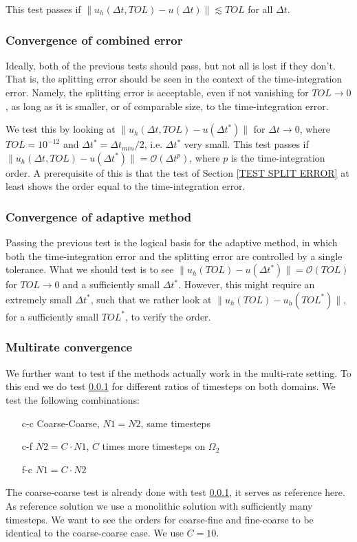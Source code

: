 \documentclass[a4paper,10pt]{article}
\begin{document}
This test passes if $\| u_h(\Delta t, TOL) - u(\Delta t)\| \lesssim TOL$ for all $\Delta t$.
%
\subsubsection{Convergence of combined error}\label{TEST COMB ERROR}
% 
Ideally, both of the previous tests should pass, but not all is lost if they don't. That is, the splitting error should be seen in the context of the time-integration error. Namely, the splitting error is acceptable, even if not vanishing for $TOL \rightarrow 0$, as long as it is smaller, or of comparable size, to the time-integration error.

We test this by looking at $\|u_h(\Delta t, TOL) - u(\Delta t^*) \|$ for $\Delta t \rightarrow 0$, where $TOL = 10^{-12}$ and $\Delta t^* = \Delta t_{min}/2$, i.e. $\Delta t^*$ very small. This test passes if $\|u_h(\Delta t, TOL) - u(\Delta t^*) \| = \mathcal{O}(\Delta t^p)$, where $p$ is the time-integration order. A prerequisite of this is that the test of Section \ref{TEST SPLIT ERROR} at least shows the order equal to the time-integration error.
% 
\subsubsection{Convergence of adaptive method}\label{TEST ADAPTIVE}
% 
Passing the previous test is the logical basis for the adaptive method, in which both the time-integration error and the splitting error are controlled by a single tolerance. What we should test is to see $\|u_h(TOL) - u(\Delta t^*) \| = \mathcal{O}(TOL)$ for $TOL \rightarrow 0$ and a sufficiently small $\Delta t^*$. However, this might require an extremely small $\Delta t^*$, such that we rather look at $\|u_h(TOL) - u_h(TOL^*) \|$, for a sufficiently small $TOL^*$, to verify the order.
% 
\subsubsection{Multirate convergence}\label{TEST MR}
% 
We further want to test if the methods actually work in the multi-rate setting. To this end we do test \ref{TEST COMB ERROR} for different ratios of timesteps on both domains. We test the following combinations:
% 
\begin{itemize}
\item[c-c] Coarse-Coarse, $N1 = N2$, same timesteps
\item[c-f] $N2 = C \cdot N1$, $C$ times more timesteps on $\Omega_2$
\item[f-c] $N1 = C \cdot N2$
\end{itemize}
% 
The coarse-coarse test is already done with test \ref{TEST COMB ERROR}, it serves as reference here. As reference solution we use a monolithic solution with sufficiently many timesteps. We want to see the orders for coarse-fine and fine-coarse to be identical to the coarse-coarse case. We use $C = 10$.
% 
\FloatBarrier
\end{document}
